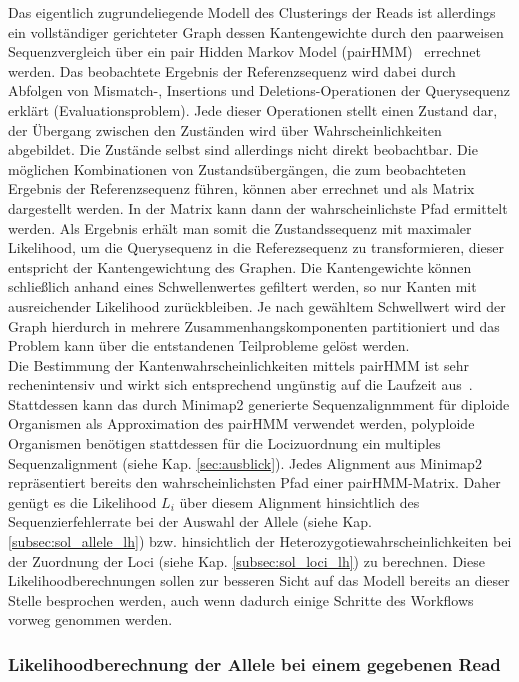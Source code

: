 Das eigentlich zugrundeliegende Modell des Clusterings der Reads ist allerdings ein vollständiger gerichteter Graph dessen Kantengewichte durch den paarweisen Sequenzvergleich über ein pair Hidden Markov Model (pairHMM)~\cite{durbin_1998} errechnet werden. Das beobachtete Ergebnis der Referenzsequenz wird dabei durch Abfolgen von Mismatch-, Insertions und Deletions-Operationen der Querysequenz erklärt (Evaluationsproblem). Jede dieser Operationen stellt einen Zustand dar, der Übergang zwischen den Zuständen wird über Wahrscheinlichkeiten abgebildet. Die Zustände selbst sind allerdings nicht direkt beobachtbar. Die möglichen Kombinationen von Zustandsübergängen, die zum beobachteten Ergebnis der Referenzsequenz führen, können aber errechnet und als Matrix dargestellt werden. In der Matrix kann dann der wahrscheinlichste Pfad ermittelt werden. Als Ergebnis erhält man somit die Zustandssequenz mit maximaler Likelihood, um die Querysequenz in die Referezsequenz zu transformieren, dieser entspricht der Kantengewichtung des Graphen. Die Kantengewichte können schließlich anhand eines Schwellenwertes gefiltert werden, so nur Kanten mit ausreichender Likelihood zurückbleiben. Je nach gewähltem Schwellwert wird der Graph hierdurch in mehrere Zusammenhangskomponenten partitioniert und das Problem kann über die entstandenen Teilprobleme gelöst werden. \\

Die Bestimmung der Kantenwahrscheinlichkeiten mittels pairHMM ist sehr rechenintensiv und wirkt sich entsprechend ungünstig auf die Laufzeit aus~\cite{durbin_1998, yoon_2009}. Stattdessen kann das durch Minimap2 generierte Sequenzalignmment für diploide Organismen als Approximation des pairHMM verwendet werden, polyploide Organismen benötigen stattdessen für die Locizuordnung ein multiples Sequenzalignment (siehe Kap. \ref{sec:ausblick}). Jedes Alignment aus Minimap2 repräsentiert bereits den wahrscheinlichsten Pfad einer pairHMM-Matrix. Daher genügt es die Likelihood $ L_{i} $ über diesem Alignment hinsichtlich des Sequenzierfehlerrate bei der Auswahl der Allele (siehe Kap. \ref{subsec:sol_allele_lh}) bzw. hinsichtlich der Heterozygotiewahrscheinlichkeiten bei der Zuordnung der Loci (siehe Kap. \ref{subsec:sol_loci_lh}) zu berechnen. Diese Likelihoodberechnungen sollen zur besseren Sicht auf das Modell bereits an dieser Stelle besprochen werden, auch wenn dadurch einige Schritte des Workflows vorweg genommen werden.

\subsubsection{Likelihoodberechnung der Allele bei einem gegebenen Read} \label{pHMM_alleles}

